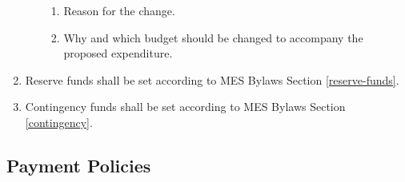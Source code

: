 \begin{enumerate}
\begin{enumerate}
    \begin{enumerate}
     \item
      Reason for the change.
     \item
      Why and which budget should be changed to accompany the proposed expenditure.
    \end{enumerate}
  \end{enumerate}
 \item
  Reserve funds shall be set according to MES Bylaws Section \ref{reserve-funds}.
 \item
  Contingency funds shall be set according to MES Bylaws Section \ref{contingency}.

\end{enumerate}

\subsection{Payment Policies}
\label{payment-policies}
